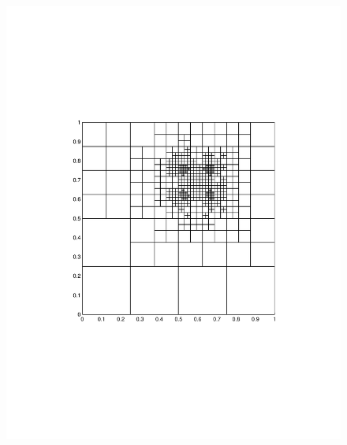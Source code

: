 \documentclass[preprint,10pt]{elsarticle}
\begin{document}
\begin{figure}[!hbtp]
{\includegraphics[scale=0.25]{../pwld_diffusion/results/amr/amr0_8_matlab_mesh_linewidth_1/amr_mms_2_threshold0_8_amr_cy17}
\label{fig:amr_cycle_17}
}
\subfigure[Cycle \# 25]{
}
\end{figure}
\end{document}
